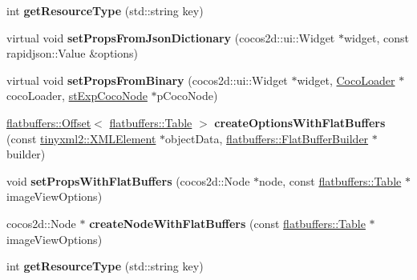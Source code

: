 \begin{DoxyCompactItemize}
int {\bfseries get\+Resource\+Type} (std\+::string key)
\item 
\mbox{\label{classcocostudio_1_1ImageViewReader_a93d9adcd86a314264c28e3d469def723}} 
virtual void {\bfseries set\+Props\+From\+Json\+Dictionary} (cocos2d\+::ui\+::\+Widget $\ast$widget, const rapidjson\+::\+Value \&options)
\item 
\mbox{\label{classcocostudio_1_1ImageViewReader_a3eda308fe5c1748a4c0b925c445488a2}} 
virtual void {\bfseries set\+Props\+From\+Binary} (cocos2d\+::ui\+::\+Widget $\ast$widget, \hyperlink{classcocostudio_1_1CocoLoader}{Coco\+Loader} $\ast$coco\+Loader, \hyperlink{structcocostudio_1_1stExpCocoNode}{st\+Exp\+Coco\+Node} $\ast$p\+Coco\+Node)
\item 
\mbox{\label{classcocostudio_1_1ImageViewReader_ad7535e1cc64858074bae2bb99b7d003b}} 
\hyperlink{structflatbuffers_1_1Offset}{flatbuffers\+::\+Offset}$<$ \hyperlink{classflatbuffers_1_1Table}{flatbuffers\+::\+Table} $>$ {\bfseries create\+Options\+With\+Flat\+Buffers} (const \hyperlink{classtinyxml2_1_1XMLElement}{tinyxml2\+::\+X\+M\+L\+Element} $\ast$object\+Data, \hyperlink{classflatbuffers_1_1FlatBufferBuilder}{flatbuffers\+::\+Flat\+Buffer\+Builder} $\ast$builder)
\item 
\mbox{\label{classcocostudio_1_1ImageViewReader_a48aed01c31ed5fbd54f14203f1eba9bc}} 
void {\bfseries set\+Props\+With\+Flat\+Buffers} (cocos2d\+::\+Node $\ast$node, const \hyperlink{classflatbuffers_1_1Table}{flatbuffers\+::\+Table} $\ast$image\+View\+Options)
\item 
\mbox{\label{classcocostudio_1_1ImageViewReader_ae6456e42dfc6a53e39b83b4d791be09d}} 
cocos2d\+::\+Node $\ast$ {\bfseries create\+Node\+With\+Flat\+Buffers} (const \hyperlink{classflatbuffers_1_1Table}{flatbuffers\+::\+Table} $\ast$image\+View\+Options)
\item 
\mbox{\label{classcocostudio_1_1ImageViewReader_a7451d62268f26bc16f41187764c8fd3d}} 
int {\bfseries get\+Resource\+Type} (std\+::string key)
\end{DoxyCompactItemize}
